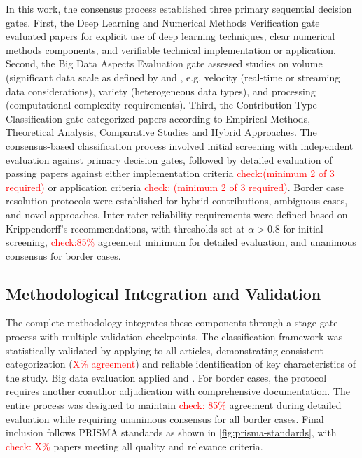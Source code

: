 \documentclass[acmsmall]{acmart}
\newcommand{\ATM}[1]{\textcolor{red}{#1}}
\begin{document}
In this work, the consensus process established three primary sequential decision gates. First, the Deep Learning and Numerical Methods Verification gate evaluated papers for explicit use of deep learning techniques, clear numerical methods components, and verifiable technical implementation or application. Second, the Big Data Aspects Evaluation gate assessed studies on volume (significant data scale as defined by \citet{diebold2012origin} and \citet{kitchin2016makes}, e.g. velocity (real-time or streaming data considerations), variety (heterogeneous data types), and processing (computational complexity requirements). Third, the Contribution Type Classification gate categorized papers according to Empirical Methods, Theoretical Analysis, Comparative Studies and Hybrid Approaches.
The consensus-based classification process involved initial screening with independent evaluation against primary decision gates, followed by detailed evaluation of passing papers against either implementation criteria \ATM{check:(minimum 2 of 3 required)} or application criteria \ATM{check: (minimum 2 of 3 required)}. Border case resolution protocols were established for hybrid contributions, ambiguous cases, and novel approaches. Inter-rater reliability requirements were defined based on Krippendorff's recommendations, with thresholds set at $\alpha > 0.8$ for initial screening, \ATM{check:85\%} agreement minimum for detailed evaluation, and unanimous consensus for border cases.

\subsection{Methodological Integration and Validation}\label{subsec:methodological-integration-and-validation}
The complete methodology integrates these components through a stage-gate process with multiple validation checkpoints. The classification framework was statistically validated by applying to all articles, demonstrating consistent categorization (\ATM{X\% agreement}) and reliable identification of key characteristics of the study. Big data evaluation applied \citep{diebold2012origin} and \citep{kitchin2016makes}. For border cases, the protocol requires another coauthor adjudication with comprehensive documentation. The entire process was designed to maintain \ATM{check: 85\%} agreement during detailed evaluation while requiring unanimous consensus for all border cases. Final inclusion follows PRISMA standards as shown in \cref{fig:prisma-standards}, with \ATM{check:  X\%} papers meeting all quality and relevance criteria.
\end{document}
